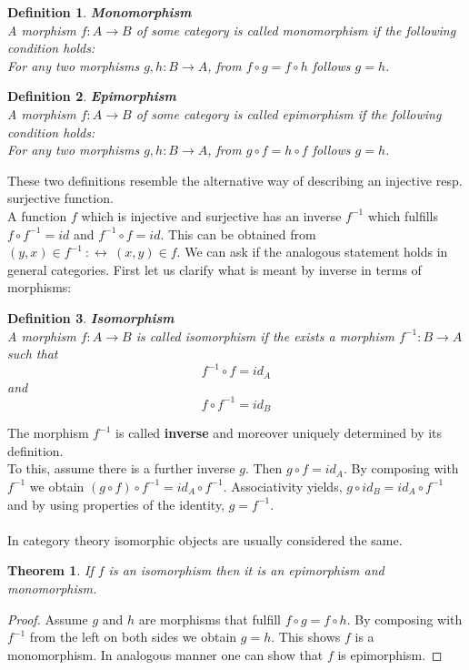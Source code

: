\documentclass[17pt]{extarticle}
\newtheorem*{definition*}{Definition}
\newtheorem*{theorem*}{Theorem}
\begin{document}
\begin{definition*}
	\textbf{Monomorphism}\\
	A morphism $f:A\rightarrow B$ of some category is called monomorphism if the following condition holds:\\
	For any two morphisms $g,h:B\rightarrow A$, from $f\circ g=f\circ h$ follows $g=h$.	
\end{definition*}

\begin{definition*}
	\textbf{Epimorphism}\\
	A morphism $f:A\rightarrow B$ of some category is called epimorphism if the following condition holds:\\
	For any two morphisms $g,h:B\rightarrow A$, from $g\circ f=h\circ f$ follows $g=h$.	
\end{definition*}

These two definitions resemble the alternative way of describing an injective resp. surjective function.\\

A function $f$ which is injective and surjective has an inverse $f^{-1}$ which fulfills $f\circ f^{-1}=id$ and $f^{-1}\circ f=id$. This can be obtained from $(y,x)\in f^{-1} \ :\leftrightarrow \ (x,y)\in f$. We can ask if the analogous statement holds in general categories. First let us clarify what is meant by inverse in terms of morphisms:

\begin{definition*}
	\textbf{Isomorphism}\\
	A morphism $f:A\rightarrow B$ is called isomorphism if the exists a morphism $f^{-1}:B\rightarrow A$ such that
	$$f^{-1}\circ f=id_A$$
	and
	$$f\circ f^{-1}=id_B$$	
\end{definition*}

The morphism $f^{-1}$ is called \textbf{inverse} and moreover uniquely determined by its definition.\\
To this, assume there is a further inverse $g$.
Then $g\circ f=id_A$. By composing with $f^{-1}$ we obtain $(g\circ f)\circ f^{-1}=id_A\circ f^{-1}$.
Associativity yields, $g\circ id_B=id_A \circ f^{-1}$ and by using properties of the identity, $g=f^{-1}$.\\ \\
In category theory isomorphic objects are usually considered the same. 

\begin{theorem*}
	If $f$ is an isomorphism then it is an epimorphism and monomorphism.
\end{theorem*}
\begin{proof}
	Assume $g$ and $h$ are morphisms that fulfill $f\circ g=f\circ h$. By composing with $f^{-1}$ from the left on
	both sides we obtain $g=h$. This shows $f$ is a monomorphism. In analogous manner one can show that $f$
	is epimorphism.
\end{proof}
\end{document}
